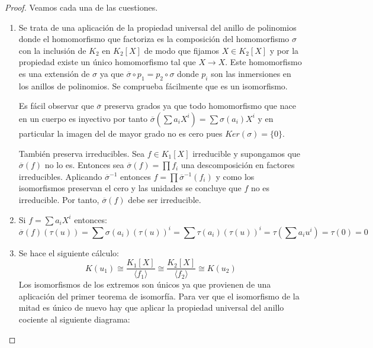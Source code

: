 \begin{proof}
	Veamos cada una de las cuestiones. 
	
	\begin{enumerate}
		\item Se trata de una aplicación de la propiedad universal del anillo de polinomios donde el homomorfismo que factoriza es la composición del homomorfismo $\sigma$ con la inclusión de $K_2$ en $K_2[X]$ de modo que fijamos $X \in K_2[X]$ y por la propiedad existe un único homomorfismo tal que $X \to X$. Este homomorfismo es una extensión de $\sigma$ ya que $\overline{\sigma} \circ p_1 = p_2 \circ \sigma$ donde $p_i$ son las inmersiones en los anillos de polinomios. Se comprueba fácilmente que es un isomorfismo.
		
			
		
		Es fácil observar que $\overline{\sigma}$ preserva grados ya que todo homomorfismo que nace en un cuerpo es inyectivo por tanto $\overline{\sigma}(\sum a_iX^i) = \sum \sigma(a_i)X^i$ y en particular la imagen del de mayor grado no es cero pues $Ker(\sigma) = \{0\}$. 
		
		También preserva irreducibles. Sea $f \in K_1[X]$ irreducible y supongamos que $\overline{\sigma}(f)$ no lo es. Entonces sea $\overline{\sigma}(f) = \prod f_i$ una descomposición en factores irreducibles. Aplicando $\overline{\sigma}^{-1}$ entonces $f = \prod \overline{\sigma}^{-1}(f_i)$ y como los isomorfismos preservan el cero y las unidades se concluye que $f$ no es irreducible. Por tanto, $\overline{\sigma}(f)$ debe ser irreducible. 
		\item Si $f = \sum a_iX^i$ entonces: $$\overline{\sigma}(f)(\tau(u)) = \sum \sigma(a_i)(\tau(u))^i = \sum \tau(a_i)(\tau(u))^i = \tau(\sum a_iu^i) = \tau(0) = 0$$		
		\item Se hace el siguiente cálculo: $$K(u_1) \cong \frac{K_1[X]}{\langle f_1 \rangle} \cong \frac{K_2[X]}{\langle f_2 \rangle} \cong K(u_2)$$ Los isomorfismos de los extremos son únicos ya que provienen de una aplicación del primer teorema de isomorfía. Para ver que el isomorfismo de la mitad es único de nuevo hay que aplicar la propiedad universal del anillo cociente al siguiente diagrama:
		

\end{enumerate}
\end{proof}
